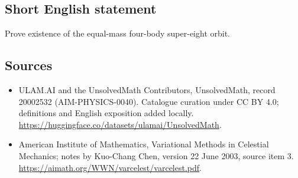 \documentclass[11pt]{article}
\begin{document}
\subsection{Short English statement}
Prove existence of the equal-mass four-body super-eight orbit.
\subsection{Sources}
\begin{itemize}
\item[\hypertarget{source:20002532:1}{S1}] ULAM.AI and the UnsolvedMath Contributors, UnsolvedMath, record 20002532 (AIM-PHYSICS-0040). Catalogue curation under CC BY 4.0; definitions and English exposition added locally.
\url{https://huggingface.co/datasets/ulamai/UnsolvedMath}.
\item[\hypertarget{source:20002532:2}{S2}] American Institute of Mathematics, Variational Methods in Celestial Mechanics; notes by Kuo-Chang Chen, version 22 June 2003, source item 3.
\url{https://aimath.org/WWN/varcelest/varcelest.pdf}.
\end{itemize}
\label{end:20002532}
\end{document}
